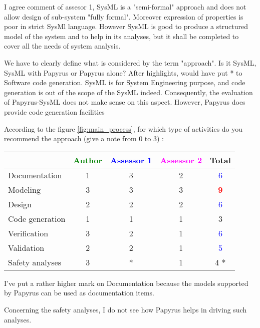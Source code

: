 \begin{assessor2}
I agree comment of assesor 1, SysML is a "semi-formal" approach and does not allow design of sub-system "fully formal". Moreover expression of properties is poor in strict SysMl language.
However SysML is good to produce a structured model of the system  and to help  in its analyses, but it shall be completed to cover all the needs of system analysis.
\end{assessor2}

\begin{author_comment}
We have to clearly define what is considered by the term "approach". Is it SysML, SysML with Papyrus or Papyrus alone?
After highlights, would have put * to Software code generation. SysML is for System Engineering purpose, and code generation is out of the scope of the SysML indeed. Consequently, the evaluation of Papyrus-SysML does not make sense on this aspect. However, Papyrus does provide code generation facilities
\end{author_comment}

According to the figure \ref{fig:main_process}, for which type of activities do you recommend the approach (give a note from 0 to 3) :

\begin{tabular}{|l | c | c | c | c|}
\hline
& \textcolor{green}{Author} & \textcolor{blue}{Assessor 1} & \textcolor{magenta}{Assessor 2} & Total \\
\hline
Documentation & 1     & 3     & 2     & \textcolor{blue}{6} \\
\hline
Modeling & 3     &  3 & 3     & \textcolor{red}{\textbf{9}} \\
\hline
Design & 2     &  2 & 2     & \textcolor{blue}{6} \\
\hline
Code generation & 1     &  1 & 1     & 3     \\
\hline
Verification & 3     &  2 & 1     & \textcolor{blue}{6} \\
\hline
Validation & 2     &  2 & 1     & \textcolor{blue}{5} \\
\hline
Safety analyses & 3     & * & 1     & 4    * \\
\hline
\end{tabular}

\begin{assessor1}
I've put a rather higher mark on Documentation because the models supported by Papyrus can be used as documentation items. 

Concerning the safety analyses, I do not see how Papyrus helps in driving such analyses. 
\end{assessor1}

